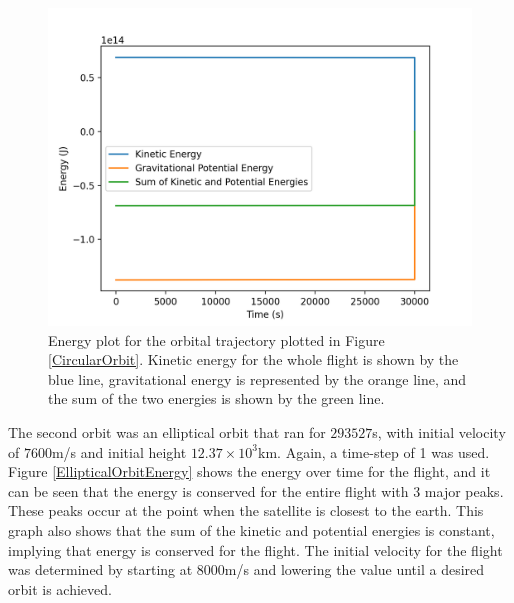 \documentclass[twocolumn, prl, nobalancelastpage, aps, citeautoscript, longbibliography, 10pt]{revtex4-1}
\begin{document}
\begin{figure}[h!]
\includegraphics[width = 0.96\linewidth]{CircularOrbitEnergy.png}
\caption{Energy plot for the orbital trajectory plotted in Figure \ref{CircularOrbit}. Kinetic energy for the whole flight is shown by the blue line, gravitational energy 
is represented by the orange line, and the sum of the two energies is shown by the green line.}
\label{CircularOrbitEnergy}

\end{figure}
The second orbit was an elliptical orbit that ran for $293527$s, with initial velocity of $7600$m/s and initial height $12.37\times10^3$km. Again, a time-step of 1 was used. Figure \ref{EllipticalOrbitEnergy} shows the 
energy over time for the flight, and it can be seen that the energy is conserved for the entire flight with 3 major peaks. These peaks occur at the point 
when the satellite is closest to the earth. This graph also shows that the sum of the kinetic and potential energies is constant, 
implying that energy is conserved for the flight. The initial velocity for the flight was determined by starting at $8000$m/s and lowering
the value until a desired orbit is achieved. 
\end{document}
